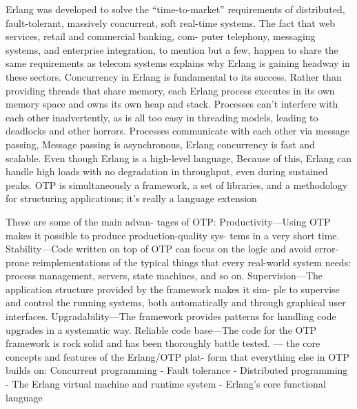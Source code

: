 Erlang was developed to solve the “time-to-market” requirements of distributed, fault-tolerant, massively concurrent, soft real-time systems.
 The fact that web services, retail and commercial banking, com- puter telephony, messaging systems, and enterprise integration, to mention but a few, happen to share the same requirements as telecom systems explains why Erlang is gaining headway in these sectors.
 Concurrency in Erlang is fundamental to its success. Rather than providing threads that share memory, each Erlang process executes in its own memory space and owns its own heap and stack. Processes can’t interfere with each other inadvertently, as is all too easy in threading models, leading to deadlocks and other horrors.
 Processes communicate with each other via message passing,  Message passing is asynchronous,
 Erlang concurrency is fast and scalable. Even though Erlang is a high-level language,  Because of this, Erlang can handle high loads with no degradation in throughput, even during sustained peaks.
 OTP is simultaneously a framework, a set of libraries, and a methodology for structuring applications; it’s really a language extension
 
These are some of the main advan- tages of OTP:
Productivity—Using OTP makes it possible to produce production-quality sys- tems in a very short time.
Stability—Code written on top of OTP can focus on the logic and avoid error- prone reimplementations of the typical things that every real-world system needs: process management, servers, state machines, and so on.
Supervision—The application structure provided by the framework makes it sim- ple to supervise and control the running systems, both automatically and through graphical user interfaces.
Upgradability—The framework provides patterns for handling code upgrades in a systematic way.
Reliable code base—The code for the OTP framework is rock solid and has been thoroughly battle tested.
 ---
the core concepts and features of the Erlang/OTP plat-
 form that everything else in OTP builds on:
Concurrent programming
- Fault tolerance
- Distributed programming
- The Erlang virtual machine and runtime system
- Erlang’s core functional language

